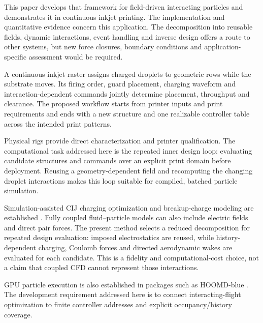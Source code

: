 \documentclass[11pt,letterpaper]{article}
\begin{document}
This paper develops that framework for field-driven interacting particles and demonstrates it in continuous inkjet printing. The implementation and quantitative evidence concern this application. The decomposition into reusable fields, dynamic interactions, event handling and inverse design offers a route to other systems, but new force closures, boundary conditions and application-specific assessment would be required.

A continuous inkjet raster assigns charged droplets to geometric rows while the substrate moves. Its firing order, guard placement, charging waveform and interaction-dependent commands jointly determine placement, throughput and clearance. The proposed workflow starts from printer inputs and print requirements and ends with a new structure and one realizable controller table across the intended print patterns.

Physical rigs provide direct characterization and printer qualification. The computational task addressed here is the repeated inner design loop: evaluating candidate structures and commands over an explicit print domain before deployment. Reusing a geometry-dependent field and recomputing the changing droplet interactions makes this loop suitable for compiled, batched particle simulation.

Simulation-assisted CIJ charging optimization and breakup-charge modeling are established \citep{sato2022,sturma2023}. Fully coupled fluid--particle models can also include electric fields and direct pair forces. The present method selects a reduced decomposition for repeated design evaluation: imposed electrostatics are reused, while history-dependent charging, Coulomb forces and directed aerodynamic wakes are evaluated for each candidate. This is a fidelity and computational-cost choice, not a claim that coupled CFD cannot represent those interactions.

GPU particle execution is also established in packages such as HOOMD-blue \citep{anderson2019}. The development requirement addressed here is to connect interacting-flight optimization to finite controller addresses and explicit occupancy/history coverage.
\end{document}
